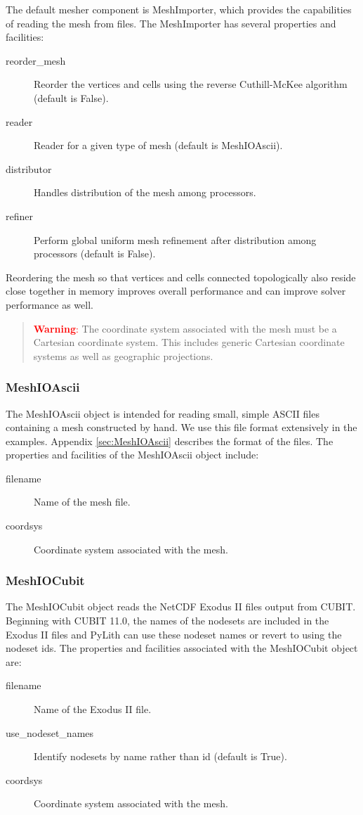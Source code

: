 The default mesher component is MeshImporter, which provides the capabilities
of reading the mesh from files. The MeshImporter has several properties
and facilities:
\begin{description}
\item [{reorder\_mesh}] Reorder the vertices and cells using the reverse
Cuthill-McKee algorithm (default is False).
\item [{reader}] Reader for a given type of mesh (default is MeshIOAscii).
\item [{distributor}] Handles distribution of the mesh among processors.
\item [{refiner}] Perform global uniform mesh refinement after distribution
among processors (default is False).
\end{description}
Reordering the mesh so that vertices and cells connected topologically
also reside close together in memory improves overall performance
and can improve solver performance as well.
\begin{quote}
\textbf{\textcolor{red}{Warning}}\textcolor{red}{:} The coordinate
system associated with the mesh must be a Cartesian coordinate system.
This includes generic Cartesian coordinate systems as well as geographic
projections.
\end{quote}

\subsubsection{MeshIOAscii}

The MeshIOAscii object is intended for reading small, simple ASCII
files containing a mesh constructed by hand. We use this file format
extensively in the examples. Appendix \ref{sec:MeshIOAscii} describes
the format of the files. The properties and facilities of the MeshIOAscii
object include:
\begin{description}
\item [{filename}] Name of the mesh file.
\item [{coordsys}] Coordinate system associated with the mesh.
\end{description}

\subsubsection{\label{sec:MeshIOCubit}MeshIOCubit}

The MeshIOCubit object reads the NetCDF Exodus II files output from
CUBIT. Beginning with CUBIT 11.0, the names of the nodesets are included
in the Exodus II files and PyLith can use these nodeset names or revert
to using the nodeset ids. The properties and facilities associated
with the MeshIOCubit object are:
\begin{description}
\item [{filename}] Name of the Exodus II file.
\item [{use\_nodeset\_names}] Identify nodesets by name rather than id
(default is True).
\item [{coordsys}] Coordinate system associated with the mesh.
\end{description}

